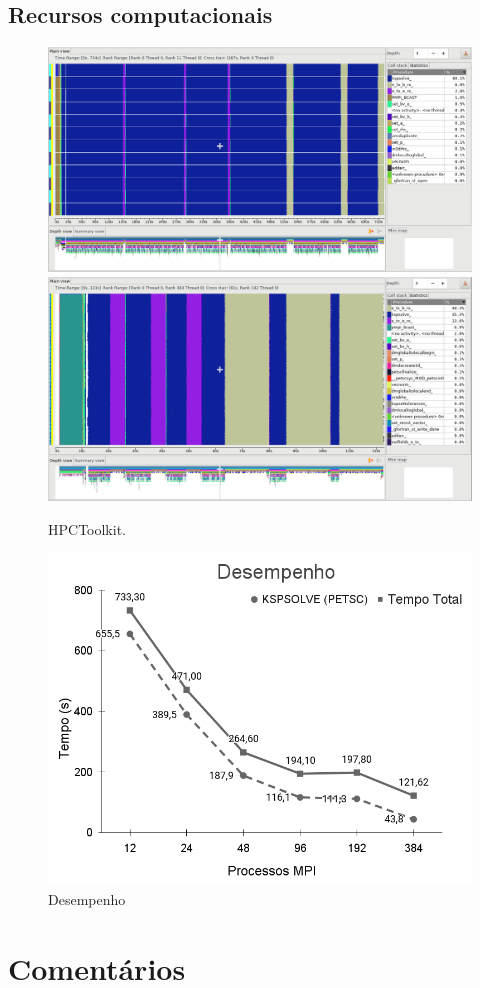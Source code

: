 \documentclass[12pt]{article}
\begin{document}
\subsection{Recursos computacionais}
\begin{figure}
\centering
\includegraphics[width=.5\textwidth]{figures/openmpi/Nodes1_MPI12.png}\includegraphics[width=.5\textwidth]{figures/openmpi/Nodes16_MPI384.png}
\caption{HPCToolkit.}
\label{fig:nodes1mpi12}
\end{figure}


\begin{figure}
\centering
\includegraphics[width=.5\textwidth]{figures/openmpi/desempenho.png}
\caption{Desempenho}
\label{fig:desempenho}
\end{figure}




\section{Comentários}
\end{document}
